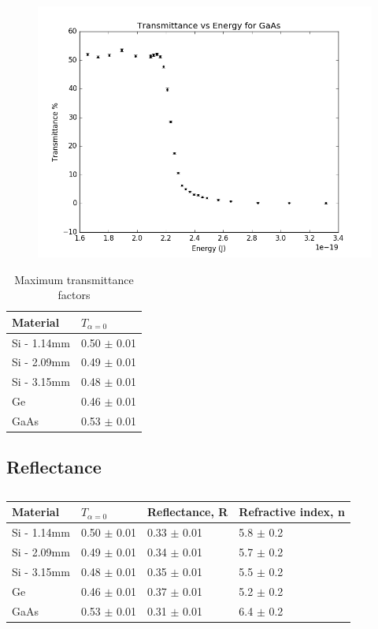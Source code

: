 \documentclass{article}
\begin{document}
\begin{figure}[!htb]
	\centering
	\includegraphics[scale=.75]{plots/GaAs.png}
 	\label{GaAs}
\end{figure}

\begin{table}[]
\centering
\caption{Maximum transmittance factors}
\label{maxtran}
\begin{tabular}{@{}ll@{}}
Material & $T_{\alpha=0}$  \\ \midrule
Si -  1.14mm      & 0.50 $\pm$ 0.01 \\
Si - 2.09mm       & 0.49 $\pm$ 0.01 \\
Si - 3.15mm       & 0.48 $\pm$ 0.01 \\
Ge       & 0.46 $\pm$ 0.01 \\
GaAs     & 0.53 $\pm$ 0.01
\end{tabular}
\end{table}

\subsection{Reflectance}

\begin{table}[]
\centering
\caption{}
\label{my-label}
\begin{tabular}{@{}llll@{}}
\toprule
Material    & $T_{\alpha=0}$  & Reflectance, R  & Refractive index, n \\ \midrule
Si - 1.14mm & 0.50 $\pm$ 0.01 & 0.33 $\pm$ 0.01 & 5.8 $\pm$ 0.2       \\
Si - 2.09mm & 0.49 $\pm$ 0.01 & 0.34 $\pm$ 0.01 & 5.7 $\pm$ 0.2       \\
Si - 3.15mm & 0.48 $\pm$ 0.01 & 0.35 $\pm$ 0.01 & 5.5 $\pm$ 0.2       \\
Ge          & 0.46 $\pm$ 0.01 & 0.37 $\pm$ 0.01 & 5.2 $\pm$ 0.2       \\
GaAs        & 0.53 $\pm$ 0.01 & 0.31 $\pm$ 0.01 & 6.4 $\pm$ 0.2       \\ \bottomrule
\end{tabular}
\end{table}
\end{document}
